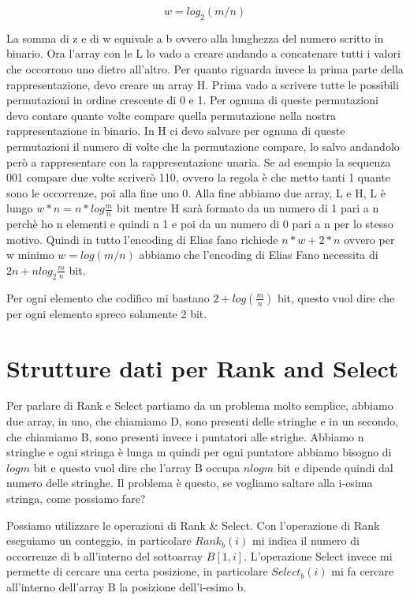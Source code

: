 \documentclass[14pt]{extreport}
\begin{document}
\begin{equation}
    w = log_2 (m/n)
\end{equation}

La somma di z e di w equivale a b ovvero alla lunghezza del numero scritto in binario.
Ora l'array con le L lo vado a creare andando a concatenare tutti i valori che occorrono uno dietro all'altro.
Per quanto riguarda invece la prima parte della rappresentazione, devo creare un array H. Prima vado a scrivere tutte le possibili permutazioni in ordine crescente di 0 e 1. Per ognuna di queste permutazioni devo contare quante volte compare quella permutazione nella nostra rappresentazione in binario.
In H ci devo salvare per ognuna di queste permutazioni il numero di volte che la permutazione compare, lo salvo andandolo però a rappresentare con la rappresentazione unaria. Se ad esempio la sequenza 001 compare due volte scriverò 110, ovvero la regola è che metto tanti 1 quante sono le occorrenze, poi alla fine uno 0.
Alla fine abbiamo due array, L e H, L è lungo $w*n = n*log\frac{m}{n}$ bit mentre H sarà formato da un numero di 1 pari a n perchè ho n elementi e quindi n 1 e poi da un numero di 0 pari a n per lo stesso motivo.
Quindi in tutto l'encoding di Elias fano richiede $n*w + 2*n$ ovvero per w minimo $w = log(m/n)$ abbiamo che l'encoding di Elias Fano necessita di $2n + nlog_2\frac{m}{n}$ bit.

Per ogni elemento che codifico mi bastano $2+log(\frac{m}{n})$ bit, questo vuol dire che per ogni elemento spreco solamente 2 bit.



\chapter{Strutture dati per Rank and Select}

Per parlare di Rank e Select partiamo da un problema molto semplice, abbiamo due array, in uno, che chiamiamo D, sono presenti delle stringhe e in un secondo, che chiamiamo B, sono presenti invece i puntatori alle strighe.
Abbiamo n stringhe e ogni stringa è lunga m quindi per ogni puntatore abbiamo bisogno di $log m$ bit e questo vuol dire che l'array B occupa $nlog m$ bit e dipende quindi dal numero delle stringhe.
Il problema è questo, se vogliamo saltare alla i-esima stringa, come possiamo fare?

Possiamo utilizzare le operazioni di Rank \& Select.
Con l'operazione di Rank eseguiamo un conteggio, in particolare $Rank_b(i)$ mi indica il numero di occorrenze di b all'interno del sottoarray $B[1,i]$.
L'operazione Select invece mi permette di cercare una certa posizione, in particolare $Select_b(i)$ mi fa cercare all'interno dell'array B la posizione dell'i-esimo b.
\end{document}

